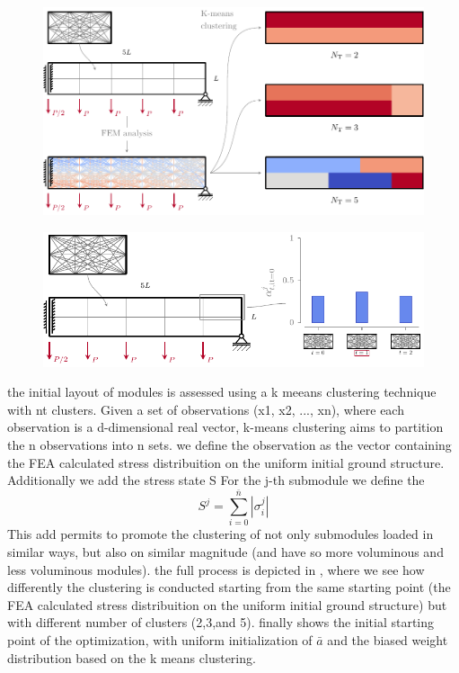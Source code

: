 \begin{figure}
    \centering
    \includegraphics{figures/06_DMO/00_stress_clustering/stress_clustering.pdf}
    \caption{}
    \label{fig:06_kmeans}
\end{figure}

\begin{figure}
    \centering
    \includegraphics{figures/06_DMO/00_x0/x0.pdf}
    \caption{}
    \label{fig:06_x0}
\end{figure}

the initial layout of modules is assessed using a k meeans clustering technique with nt clusters. Given a set of observations (x1, x2, ..., xn), where each observation is a d-dimensional real vector, k-means clustering aims to partition the n observations into n sets. we define the observation as the vector containing the FEA calculated stress distribuition on the uniform initial ground structure. Additionally we add the stress state S For the j-th submodule we define the 
\begin{equation}
    S^j=\sum_{i=0}^{\bar{n}}|\sigma^j_i|
\end{equation}
This add permits to promote the clustering of not only submodules loaded in similar ways, but also on similar magnitude (and have so more voluminous and less voluminous modules). the full process is depicted in , where we see how differently the clustering is conducted starting from the same starting point (the FEA calculated stress distribuition on the uniform initial ground structure) but with different number of clusters (2,3,and 5).  finally shows the initial starting point of the optimization, with uniform initialization of $\bar{a}$ and the biased weight distribution based on the k means clustering.


